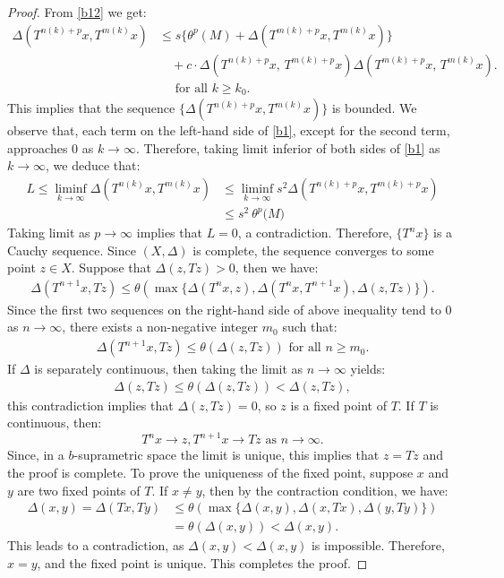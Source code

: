 \documentclass[pdflatex,sn-mathphys-num]{sn-jnl}%
\theoremstyle{thmstyleone}%
\theoremstyle{thmstyletwo}%
\theoremstyle{thmstylethree}%
\begin{document}
\begin{proof}
From \eqref{b12}
we get:
\begin{align*}
\Delta(T^{n(k)+p}x, T^{m(k)}x)& \leq s \{\theta^{p}(M)+ \Delta(T^{m(k)+p}x, T^{m(k)}x)\} \\
&\quad + c \cdot \Delta\left(T^{n(k)+p}x, \, T^{m(k)+p}x\right) \Delta\left(T^{m(k)+p}x, \, T^{m(k)}x\right).\\
&\quad\text{ for all }k\ge k_0.
\end{align*}
 This implies that the sequence \(\{\Delta(T^{n(k)+p}x, T^{m(k)}x) \}\) is bounded. We observe that, each term on the left-hand side of \eqref{b1}, except for the second term, approaches \(0\) as \(k\to\infty\). Therefore, taking limit inferior  of both sides of \eqref{b1} as \(k\to \infty\), we deduce that:
\begin{align*}
L\leq \liminf_{k\to \infty}\Delta(T^{n(k)}x, T^{m(k)}x) &\le  \liminf_{k\to\infty} s^{2} \Delta(T^{n(k)+p}x, T^{m(k)+p}x)\\
&\leq s^{2} \ \theta^{p}\big(M\big)
\end{align*}
Taking limit as \(p\to \infty\)  implies that \(L=0\),  a contradiction. Therefore, \(\{T^{n}x\}\) is a Cauchy sequence. Since \((X, \Delta)\) is complete, the sequence converges to some point \(z \in X\). Suppose that \(\Delta(z,Tz)>0\), then we have:
\begin{align}
\Delta(T^{n+1}x, Tz) \le\theta(\max\{\Delta(T^{n}x,z),\Delta(T^{n}x,T^{n+1}x),\Delta(z,Tz)\}).
\end{align}
Since the first two sequences on the right-hand side of above inequality tend to \(0\) as \(n\to\infty\), there exists a non-negative integer \(m_0\) such that:
\begin{align}
\Delta(T^{n+1}x, Tz) \le\theta(\Delta(z,Tz)) \text{ for all }n\ge m_0. 
\end{align}
If $\Delta$ is separately continuous, then taking the limit as \( n \to \infty \) yields:
\begin{align}
\Delta(z, Tz) \le\theta(\Delta(z,Tz))<\Delta(z,Tz),
\end{align}
 this contradiction implies that \( \Delta(z, Tz) = 0 \), so \( z \) is a fixed point of \( T \). If \(T\) is continuous, then:
\[
T^{n}x\to z,T^{n+1}x\to Tz \text{ as } n\to \infty.
\]
Since, in a \(b\)-suprametric space the limit is unique, this implies that \(z=Tz\) and the proof is complete.
To prove the uniqueness of the fixed point, suppose \( x \) and \( y \) are two fixed points of \( T \). If \( x \neq y \), then by the contraction condition, we have:
\begin{align}
\Delta(x, y) = \Delta(Tx, Ty) &\leq \theta\left( \max\{\Delta(x, y), \Delta(x, Tx), \Delta(y, Ty)\} \right) \nonumber\\
&= \theta\left(\Delta(x, y)\right) <\Delta(x,y) .\nonumber 
\end{align}
This leads to a contradiction, as \( \Delta(x, y) < \Delta(x, y) \) is impossible. Therefore, \( x = y \), and the fixed point is unique. This completes the proof.
\end{proof}
\end{document}
